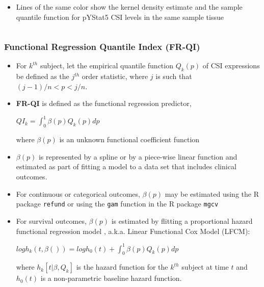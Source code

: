 \documentclass[t,8pt]{beamer}
\begin{document}
{\begin{columns}[T]
		\begin{column}{0.3\textwidth}
		\begin{itemize}
              	  \item Lines of the same color show the kernel density estimate and the sample quantile function for pYStat5 CSI levels in the same sample tissue
             \end{itemize}  
		\end{column}
	\end{columns}			
		
	}
	
	
	\frame
	{\frametitle{Functional Regression Quantile Index (FR-QI)}
		\begin{itemize}	
		    \item  For $k^{th}$ subject, let the  \color{red} empirical quantile function $Q_{k}(p)$  \color{black} of CSI expressions
         be defined as the $j^{th}$ order statistic, where $j$ is such that $(j-1)/n<p<j/n$. 	
		\item   \color{red} \textbf{FR-QI}  \color{black} is defined as the functional regression  \cite{James02} predictor,
			 \color{red}
		 \begin{center}
		 	$QI_{k}= \int_{0}^{1} \beta(p)Q_{k}(p)dp$
		\end{center}
			 \color{black}
		\linebreak
		where $\beta(p)$ is an unknown functional coefficient function  \cite{Yi23}
\item $\beta(p)$ is represented by a spline or by a piece-wise linear function and estimated as part of fitting a model to a data set that includes clinical outcomes. 
	\item For continuous or categorical outcomes, $\beta(p)$ may be estimated using the R package \texttt{refund} or using the \texttt{gam} function in the R package \texttt{mgcv}  
	\item For survival outcomes, $\beta(p)$ is estimated by flitting a proportional hazard functional regression model \cite{Gellar15}, a.k.a. Linear Functional Cox Model (LFCM):
              \begin{center}
		 	$log h_{k}(t, \beta())=log h_{0} (t)+ \int_{0}^{1} \beta(p)Q_{k}(p)dp$
	    \end{center}
where $h_{k}[t|\beta, Q_{k}]$ is the hazard function for the $k^{th}$ subject at time $t$ and $h_{0}(t)$ is a non-parametric baseline hazard function.		     

\end{itemize}}
\end{document}

